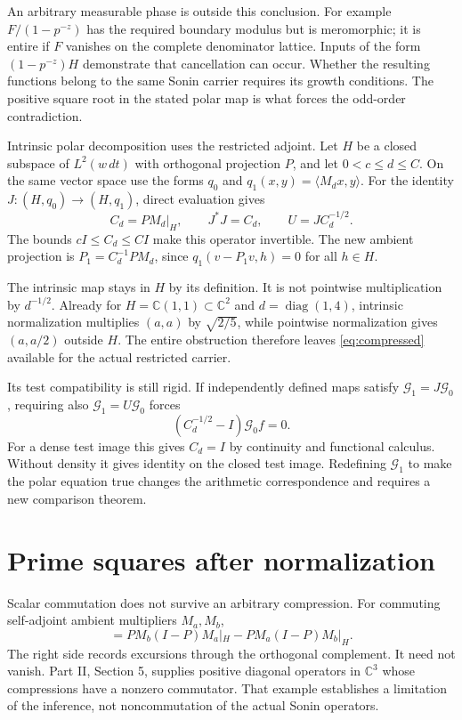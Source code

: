 \documentclass[11pt,letterpaper]{article}
\theoremstyle{definition}
\theoremstyle{remark}
\newcommand{\C}{\mathbb C}
\begin{document}
An arbitrary measurable phase is outside this conclusion.
For example $F/(1-p^{-z})$ has the required boundary modulus
but is meromorphic; it is entire if $F$ vanishes on the complete
denominator lattice. Inputs of the form $(1-p^{-z})H$ demonstrate
that cancellation can occur. Whether the resulting functions
belong to the same Sonin carrier requires its growth conditions.
The positive square root in the stated polar map is what forces
the odd-order contradiction.

Intrinsic polar decomposition uses the restricted adjoint. Let
$H$ be a closed subspace of $L^2(w\,dt)$ with orthogonal
projection $P$, and let $0<c\le d\le C$. On the same vector
space use the forms $q_0$ and $q_1(x,y)=\langle M_dx,y\rangle$.
For the identity $J:(H,q_0)\to(H,q_1)$, direct evaluation gives
\begin{equation}
 C_d=PM_d|_H,\qquad J^*J=C_d,\qquad U=JC_d^{-1/2}.
 \label{eq:compressed}
\end{equation}
The bounds $cI\le C_d\le CI$ make this operator invertible.
The new ambient projection is $P_1=C_d^{-1}PM_d$, since
$q_1(v-P_1v,h)=0$ for all $h\in H$.

The intrinsic map stays in $H$ by its definition. It is not
pointwise multiplication by $d^{-1/2}$. Already for
$H=\C(1,1)\subset\C^2$ and $d=\operatorname{diag}(1,4)$,
intrinsic normalization multiplies $(a,a)$ by $\sqrt{2/5}$,
while pointwise normalization gives $(a,a/2)$ outside $H$.
The entire obstruction therefore leaves \eqref{eq:compressed}
available for the actual restricted carrier.

Its test compatibility is still rigid. If independently defined
maps satisfy $\mathcal G_1=J\mathcal G_0$, requiring also
$\mathcal G_1=U\mathcal G_0$ forces
\begin{equation}
 (C_d^{-1/2}-I)\mathcal G_0f=0.
 \label{eq:polar-rigidity}
\end{equation}
For a dense test image this gives $C_d=I$ by continuity and
functional calculus. Without density it gives identity on the
closed test image. Redefining $\mathcal G_1$ to make the polar
equation true changes the arithmetic correspondence and requires
a new comparison theorem.

\section{Prime squares after normalization}

Scalar commutation does not survive an arbitrary compression.
For commuting self-adjoint ambient multipliers $M_a,M_b$,
\begin{equation}
 [PM_a|_H,PM_b|_H]
 =PM_b(I-P)M_a|_H-PM_a(I-P)M_b|_H.
 \label{eq:commutator}
\end{equation}
The right side records excursions through the orthogonal
complement. It need not vanish. Part II, Section 5, supplies
positive diagonal operators in $\C^3$ whose compressions have
a nonzero commutator. That example establishes a limitation of
the inference, not noncommutation of the actual Sonin operators.
\end{document}
